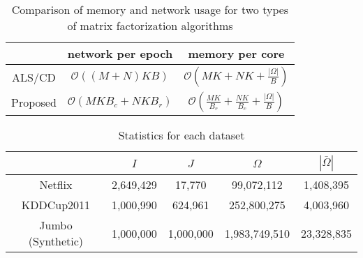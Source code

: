 \documentclass{article}
\newcommand{\1}[0]{\ensuremath{\boldsymbol{1}}\xspace}
\begin{document}
\begin{table}\label{mf_alg_comp}
\scriptsize
\caption{Comparison of memory and network usage for two types of matrix factorization algorithms}
\begin{tabular}{c|c|c}
~  &  network per epoch & memory per core\\
\hline
ALS/CD & $\mathcal{O}( (M+N) K B)$  & $\mathcal{O}(MK+NK + \frac{|\Omega|}{B})$  \\
Proposed & $\mathcal{O}( MK B_{c} + NK B_{r})$ & $\mathcal{O}(\frac{MK}{B_{r}}+\frac{NK}{B_{c}} + \frac{|\Omega|}{B})$ \\
\end{tabular}
\end{table}


\begin{table}\label{mf_datasets}
\scriptsize
\caption{ Statistics for each dataset}
\begin{tabular}{c|cccc}
~ & $I$ & $J$ & $\Omega$ & $|\bar\Omega|$ \\
\hline
Netflix & 2,649,429 & 17,770 & 99,072,112 &  1,408,395\\
KDDCup2011 & 1,000,990  & 624,961 &  252,800,275 & 4,003,960\\
Jumbo (Synthetic) & 1,000,000 & 1,000,000 & 1,983,749,510 & 23,328,835
\end{tabular}
\end{table}




\newpage
\small


\end{document}
